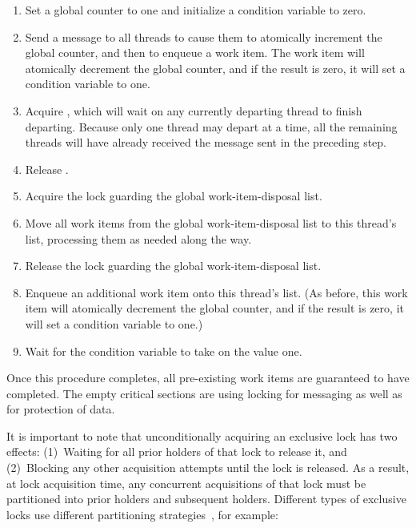 {	\begin{enumerate}
	\item	Set a global counter to one and initialize a condition
		variable to zero.
	\item	Send a message to all threads to cause them to atomically
		increment the global counter, and then to enqueue a
		work item.
		The work item will atomically decrement the global
		counter, and if the result is zero, it will set a
		condition variable to one.
	\item	Acquire , which will wait on any currently departing
		thread to finish departing.
		Because only one thread may depart at a time, all the
		remaining threads will have already received the message
		sent in the preceding step.
	\item	Release .
	\item	Acquire the lock guarding the global work-item-disposal list.
	\item	Move all work items from the global work-item-disposal list
		to this thread's list, processing them as needed along the way.
	\item	Release the lock guarding the global work-item-disposal list.
	\item	Enqueue an additional work item onto this thread's list.
		(As before, this work item will atomically decrement
		the global counter, and if the result is zero, it will
		set a condition variable to one.)
	\item	Wait for the condition variable to take on the value one.
	\end{enumerate}

	Once this procedure completes, all pre-existing work items are
	guaranteed to have completed.
	The empty critical sections are using locking for messaging as
	well as for protection of data.
}\QuickQuizEnd

\QuickQuizLabel{\QlockingQemptycriticalsection}

It is important to note that unconditionally acquiring an exclusive lock
has two effects:
(1)~Waiting for all prior holders of that lock to release it, and
(2)~Blocking any other acquisition attempts until the lock is released.
As a result, at lock acquisition time, any concurrent acquisitions of
that lock must be partitioned into prior holders and subsequent
holders.
Different types of exclusive locks use different partitioning
strategies~\cite{BjoernBrandenburgPhD,Guerraoui:2019:LPA:3319851.3301501},
for example:

